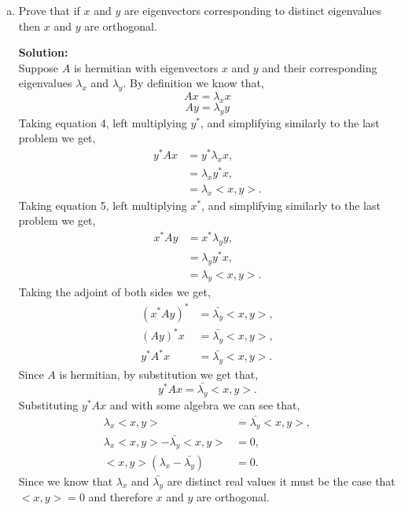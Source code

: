 \documentclass[12pt]{article}
\makeatletter
\theoremstyle{homework}
\newenvironment{exercise}[1]
{\def\@currentlabel{#1}\exercisecore}
{\endexercisecore}
\newcommand{\localhead}[1]{\par\smallskip\noindent\textbf{#1}\nobreak\\}%
\newcommand\solution{\localhead{Solution:}}
\makeatother
\begin{document}
\begin{exercise}{2.3}
\begin{enumerate}[a.]
    \item Prove that if $x$ and $y$ are eigenvectors corresponding to distinct eigenvalues 
    then $x$ and $y$ are orthogonal. \\
    \solution Suppose $A$ is hermitian with eigenvectors $x$ and $y$ and their corresponding eigenvalues $\lambda_x$ and 
    $\lambda_y$. By definition we know that, 
    \begin{equation}
      Ax = \lambda_xx
    \end{equation}
    \begin{equation}
      Ay = \lambda_yy
    \end{equation}
    Taking equation 4, left multiplying $y^*$, and simplifying similarly to the last problem we get, 
    \begin{align*}
      y^*Ax &= y^* \lambda_xx,\\
      &=  \lambda_x y^*x,\\
      &=  \lambda_x <x,y>.
    \end{align*}
    Taking equation 5, left multiplying $x^*$, and simplifying similarly to the last problem we get, 
    \begin{align*}
      x^*Ay &= x^* \lambda_yy,\\
      &=  \lambda_y y^*x,\\
      &=  \lambda_y <x,y>.
    \end{align*}
    Taking the adjoint of both sides we get, 
    \begin{align*}
      (x^*Ay)^* &= \bar{\lambda_y} <x,y>,\\
      (Ay)^*x &= \bar{\lambda_y} <x,y>,\\
      y^*A^*x &= \bar{\lambda_y} <x,y>.
    \end{align*}
    Since $A$ is hermitian, by substitution we get that,
    \begin{equation*}
      y^*Ax = \bar{\lambda_y} <x,y>.
    \end{equation*}
    Substituting $y^*Ax$ and with some algebra we can see that,
    \begin{align*}
      \lambda_x <x,y> &= \bar{\lambda_y} <x,y>,\\
      \lambda_x <x,y> - \bar{\lambda_y} <x,y> &= 0,\\
      <x,y>(\lambda_x - \bar{\lambda_y}) &= 0.
    \end{align*}
    Since we know that $\lambda_x$ and $\bar{\lambda_y}$ are distinct real values it must be the case that 
    $<x,y> = 0$ and therefore $x$ and $y$ are orthogonal. 
    \vspace{.15in}
  \end{enumerate} 

\end{exercise}
\end{document}

